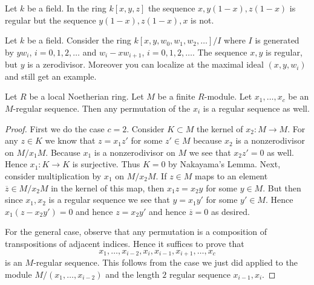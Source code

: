\begin{example}\cite[\href{https://stacks.math.columbia.edu/tag/00LG}{Example 00LG}]{stacks-project}
	\label{example-global-regular}
	Let $k$ be a field. In the ring $k[x, y, z]$
	the sequence $x, y(1-x), z(1-x)$ is regular
	but the sequence $y(1-x), z(1-x), x$ is not.
\end{example}

\begin{example}\cite[\href{https://stacks.math.columbia.edu/tag/00LH}{Example 00LH}]{stacks-project}
	\label{example-local-regular}
	Let $k$ be a field. Consider the ring
	$k[x, y, w_0, w_1, w_2, \ldots]/I$
	where $I$ is generated by $yw_i$, $i = 0, 1, 2, \ldots$ and
	$w_i - xw_{i + 1}$, $i = 0, 1, 2, \ldots$.
	The sequence $x, y$ is regular, but $y$ is a zerodivisor.
	Moreover you can localize at the maximal ideal
	$(x, y, w_i)$ and still get an example.
\end{example}

\begin{lemma}\cite[\href{https://stacks.math.columbia.edu/tag/00LJ}{Lemma 00LJ}]{stacks-project}
	\label{lemma-permute-xi}
	Let $R$ be a local Noetherian ring.
	Let $M$ be a finite $R$-module.
	Let $x_1, \ldots, x_c$ be an $M$-regular sequence.
	Then any permutation of the $x_i$ is a regular
	sequence as well.
\end{lemma}

\begin{proof}
	First we do the case $c = 2$.
	Consider $K \subset M$ the kernel of $x_2 : M \to M$.
	For any $z \in K$ we know that $z = x_1 z'$
	for some $z' \in M$ because
	$x_2$ is a nonzerodivisor on $M/x_1M$.
	Because $x_1$ is a nonzerodivisor on $M$ we see that $x_2 z' = 0$
	as well. Hence $x_1 : K \to K$ is surjective.
	Thus $K = 0$ by Nakayama's Lemma.
	Next, consider multiplication by $x_1$ on $M/x_2M$.
	If $z \in M$ maps to an element $\overline{z} \in M/x_2M$
	in the kernel of this map, then $x_1 z = x_2 y$ for some $y \in M$.
	But then since $x_1, x_2$ is a regular sequence we see that
	$y = x_1 y'$ for some $y' \in M$. Hence $x_1 ( z - x_2 y' ) =0$
	and hence $z = x_2 y'$ and hence $\overline{z} = 0$ as desired.
	
	\medskip\noindent
	For the general case, observe that any permutation is
	a composition of transpositions of adjacent indices.
	Hence it suffices to prove that
	$$
	x_1, \ldots, x_{i-2}, x_i, x_{i-1}, x_{i + 1}, \ldots, x_c
	$$
	is an $M$-regular sequence. This follows from the case we
	just did applied to the module $M/(x_1, \ldots, x_{i-2})$
	and the length $2$ regular sequence $x_{i-1}, x_i$.
\end{proof}

